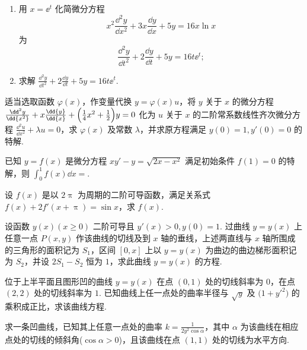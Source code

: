 	\begin{ti}
		\begin{enumerate}
			\item 用 $x = \ee^{t}$ 化简微分方程
			\[
				x^{2} \frac{\dd^{2}y}{\dd{x^{2}}} + 3x \frac{\dd{y}}{\dd{x}} + 5y = 16x \ln x
			\]
			为
			\[
				\frac{\dd^{2}y}{\dd{t^{2}}} + 2\frac{\dd{y}}{\dd{t}} + 5y = 16t \ee^{t};
			\]
			\item 求解 $\frac{\dd^{2}y}{\dd{t^{2}}} + 2\frac{\dd{y}}{\dd{t}} + 5y = 16t \ee^{t}$.
		\end{enumerate}
	\end{ti}

	\begin{ti}
		适当选取函数 $\varphi(x)$，作变量代换 $y = \varphi(x) u$，将 $y$ 关于 $x$ 的微分方程 $\frac{\dd^{2}y}{\dd{x^{2}}} + x \frac{\dd{y}}{\dd{x}} + \Bigl( \frac{1}{4}x^{2} + \frac{1}{2} \Bigr)y = 0$ 化为 $u$ 关于 $x$ 的二阶常系数线性齐次微分方程 $\frac{\dd^{2}u}{\dd{x^{2}}} + \lambda u = 0$，求 $\varphi(x)$ 及常数 $\lambda$，并求原方程满足 $y(0) = 1,y'(0) = 0$ 的特解.
	\end{ti}

	\begin{ti}
		已知 $y = f(x)$ 是微分方程 $xy' - y = \sqrt{2x - x^{2}}$ 满足初始条件 $f(1) = 0$ 的特解，则 $\int_{0}^{1} f(x) \dd{x} = $\htwo.
	\end{ti}

	\begin{ti}
		设 $f(x)$ 是以 $2\uppi$ 为周期的二阶可导函数，满足关系式 $f(x) + 2f'(x + \uppi) = \sin x$，求 $f(x)$.
	\end{ti}

	\begin{ti}
		设函数 $y(x) (x \geq 0)$ 二阶可导且 $y'(x) > 0, y(0) = 1$. 过曲线 $y = y(x)$ 上任意一点 $P(x,y)$ 作该曲线的切线及到 $x$ 轴的垂线，上述两直线与 $x$ 轴所围成的三角形的面积记为 $S_{1}$，区间 $[0,x]$ 上以 $y = y(x)$ 为曲边的曲边梯形面积记为 $S_{2}$，并设 $2S_{1} - S_{2}$ 恒为 $1$，求此曲线 $y = y(x)$ 的方程.
	\end{ti}

	\begin{ti}
		位于上半平面且图形凹的曲线 $y = y(x)$ 在点 $(0,1)$ 处的切线斜率为 $0$，在点 $(2,2)$ 处的切线斜率为 $1$. 已知曲线上任一点处的曲率半径与 $\sqrt{y}$ 及 $\bigl( 1 + y'^{2} \bigr)$ 的乘积成正比，求该曲线方程.
	\end{ti}

	\begin{ti}
		求一条凹曲线，已知其上任意一点处的曲率 $k = \frac{1}{2y^{2} \cos \alpha}$，其中 $\alpha$ 为该曲线在相应点处的切线的倾斜角($\cos\alpha > 0$)，且该曲线在点 $(1,1)$ 处的切线为水平方向.
	\end{ti}

